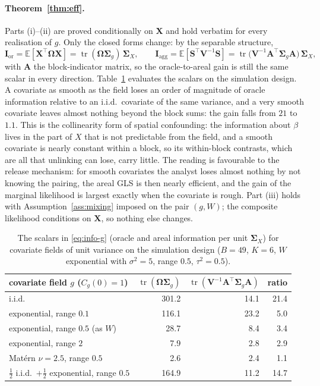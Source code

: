 \documentclass[11pt]{article}
\theoremstyle{definition}
\newcommand{\bX}{\mathbf{X}}
\newcommand{\bV}{\mathbf{V}}
\newcommand{\bSig}{\boldsymbol{\Sigma}}
\newcommand{\bOm}{\boldsymbol{\Omega}}
\newcommand{\E}{\mathbb{E}}
\newcommand{\tr}{\operatorname{tr}}
\newcommand{\agg}{\mathrm{agg}}
\newcommand{\orc}{\mathrm{or}}
\begin{document}
\paragraph{Theorem~\ref{thm:eff}.} Parts (i)--(ii) are proved conditionally on $\bX$ and hold verbatim for every realisation of $g$. Only the closed forms change: by the separable structure,
\begin{equation}\label{eq:info-g}
\mathbf I_\orc=\E[\bX^\top\bOm\bX]=\tr(\bOm\bSig_g)\,\bSig_X,\qquad \mathbf I_\agg=\E[\mathbf S^\top\bV^{-1}\mathbf S]=\tr\big(\bV^{-1}\mathbf A^\top\bSig_g\mathbf A\big)\,\bSig_X,
\end{equation}
with $\mathbf A$ the block-indicator matrix, so the oracle-to-areal gain is still the same scalar in every direction. Table~\ref{tab:spatialX} evaluates the scalars on the simulation design. A covariate as smooth as the field loses an order of magnitude of oracle information relative to an i.i.d.\ covariate of the same variance, and a very smooth covariate leaves almost nothing beyond the block sums: the gain falls from $21$ to $1.1$. This is the collinearity form of spatial confounding: the information about $\beta$ lives in the part of $X$ that is not predictable from the field, and a smooth covariate is nearly constant within a block, so its within-block contrasts, which are all that unlinking can lose, carry little. The reading is favourable to the release mechanism: for smooth covariates the analyst loses almost nothing by not knowing the pairing, the areal GLS is then nearly efficient, and the gain of the marginal likelihood is largest exactly when the covariate is rough. Part (iii) holds with Assumption~\ref{ass:mixing} imposed on the pair $(g,W)$; the composite likelihood conditions on $\bX$, so nothing else changes.

\begin{table}[t]\centering\small
\begin{tabular}{lrrr}\toprule
covariate field $g$ ($C_g(0)=1$) & $\tr(\bOm\bSig_g)$ & $\tr(\bV^{-1}\mathbf A^\top\bSig_g\mathbf A)$ & ratio\\\midrule
i.i.d. & 301.2 & 14.1 & 21.4\\
exponential, range $0.1$ & 116.1 & 23.2 & 5.0\\
exponential, range $0.5$ (as $W$) & 28.7 & 8.4 & 3.4\\
exponential, range $2$ & 7.9 & 2.8 & 2.9\\
Mat\'ern $\nu=2.5$, range $0.5$ & 2.6 & 2.4 & 1.1\\
$\tfrac12$ i.i.d.\ $+\tfrac12$ exponential, range $0.5$ & 164.9 & 11.2 & 14.7\\\bottomrule
\end{tabular}
\caption{The scalars in \eqref{eq:info-g} (oracle and areal information per unit $\bSig_X$) for covariate fields of unit variance on the simulation design ($B=49$, $K=6$, $W$ exponential with $\sigma^2=5$, range $0.5$, $\tau^2=0.5$).}
\label{tab:spatialX}
\end{table}
\end{document}
